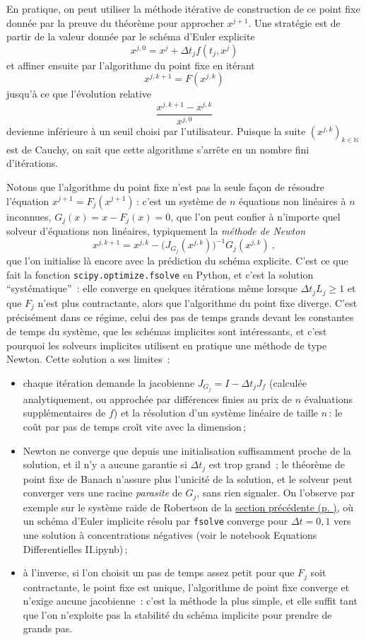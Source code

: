 En pratique, on peut utiliser la méthode itérative de construction de ce
point fixe donnée par la preuve du théorème pour approcher \(x^{j+1}\).
Une stratégie est de partir de la valeur donnée par le schéma d'Euler
explicite \[
x^{j,0} = x^{j} + {\Delta t}_j f(t_j,x^{j})
\] et affiner ensuite par l'algorithme du point fixe en itérant \[
x^{j,k+1} = F(x^{j,k}) 
\] jusqu'à ce que l'évolution relative \[
\frac{x^{j,k+1}-x^{j,k}}{x^{j,0}}
\] devienne inférieure à un seuil choisi par l'utilisateur. Puisque la
suite \((x^{j,k})_{k\in \mathbb{N}}\) est de Cauchy, on sait que cette
algorithme s'arrête en un nombre fini d'itérations.

Notons que l'algorithme du point fixe n'est pas la seule façon de
résoudre l'équation \(x^{j+1} = F_j(x^{j+1})\)\,: c'est un système de
\(n\) équations non linéaires à \(n\) inconnues, \(G_j(x) = x - F_j(x) = 0\),
que l'on peut confier à n'importe quel solveur d'équations non linéaires,
typiquement la \emph{méthode de Newton} \[
x^{j,k+1} = x^{j,k} - \big(J_{G_j}(x^{j,k})\big)^{-1} G_j(x^{j,k}) \ ,
\] que l'on initialise là encore avec la prédiction du schéma explicite.
C'est ce que fait la fonction \texttt{scipy.optimize.fsolve} en Python,
et c'est la solution ``systématique''~: elle converge en quelques
itérations même lorsque \({\Delta t}_j L_j \geq 1\) et que \(F_j\) n'est
plus contractante, alors que l'algorithme du point fixe diverge. C'est
précisément dans ce régime, celui des pas de temps grands devant les
constantes de temps du système, que les schémas implicites sont
intéressants, et c'est pourquoi les solveurs implicites utilisent en
pratique une méthode de type Newton. Cette solution a ses limites~:

\begin{itemize}
\item
  chaque itération demande la jacobienne \(J_{G_j} = I - {\Delta t}_j J_f\)
  (calculée analytiquement, ou approchée par différences finies au prix de
  \(n\) évaluations supplémentaires de \(f\)) et la résolution d'un
  système linéaire de taille \(n\)\,: le coût par pas de temps croît vite
  avec la dimension\,;
\item
  Newton ne converge que depuis une initialisation suffisamment proche de
  la solution, et il n'y a aucune garantie si \({\Delta t}_j\) est
  trop grand~; le théorème de point fixe de Banach n'assure plus l'unicité
  de la solution, et le solveur peut converger vers une racine
  \emph{parasite} de \(G_j\), sans rien signaler. On l'observe
  par exemple sur le système raide de Robertson de la
  \protect\hyperlink{ed2-sec_systRaides}{section précédente (p.
  \pageref*{ed2-sec_systRaides})}, où un schéma d'Euler implicite résolu
  par \texttt{fsolve} converge pour \({\Delta t}=0{,}1\) vers une solution
  à concentrations négatives (voir le notebook Equations Differentielles II.ipynb)\,;
\item
  à l'inverse, si l'on choisit un pas de temps assez petit pour que
  \(F_j\) soit contractante, le point fixe est unique, l'algorithme de
  point fixe converge et n'exige aucune jacobienne~: c'est la méthode
  la plus simple, et elle suffit tant que l'on n'exploite pas la
  stabilité du schéma implicite pour prendre de grands pas.
\end{itemize}


